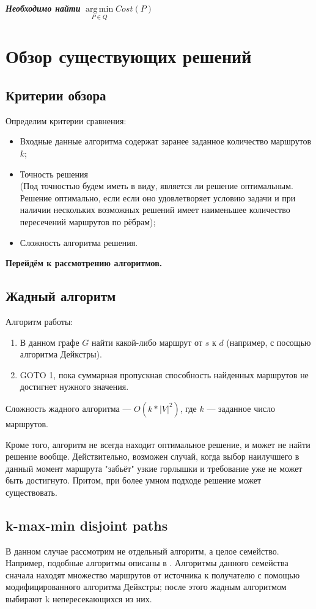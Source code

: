 \documentclass[a4paper]{article}
\DeclareMathOperator*{\argmin}{arg\,min}
\begin{document}
\textit{\textbf{Необходимо найти}} $\argmin\limits_{P\in Q} Cost(P)$

\newpage
\section{Обзор существующих решений}
\subsection{Критерии обзора}
Определим критерии сравнения:
\begin{itemize}
\item Входные данные алгоритма содержат заранее заданное количество маршрутов $k$;
\item Точность решения\\(Под точностью будем иметь в виду, является ли решение оптимальным. Решение оптимально, если если оно удовлетворяет условию задачи и при наличии нескольких возможных решений имеет наименьшее количество пересечений маршрутов по рёбрам);
\item Сложность алгоритма решения.
\end{itemize}

\textbf{Перейдём к рассмотрению алгоритмов.}

\subsection{Жадный алгоритм}
Алгоритм работы:
\begin{enumerate}
\item В данном графе $G$ найти какой-либо маршрут от $s$ к $d$ (например, с посощью алгоритма Дейкстры).
\item GOTO 1, пока суммарная пропускная способность найденных маршрутов не достигнет нужного значения.
\end{enumerate}

Сложность жадного алгоритма --- $O(k*|V|^2)$, где $k$ --- заданное число маршрутов.

Кроме того, алгоритм не всегда находит оптимальное решение, и может не найти решение вообще. Действительно, возможен случай, когда выбор наилучшего в данный момент маршрута "забьёт" узкие горлышки и требование уже не может быть достигнуто. Притом, при более умном подходе решение может существовать.

\subsection{k-max-min disjoint paths}
В данном случае рассмотрим не отдельный алгоритм, а целое семейство. Например, подобные алгоритмы описаны в \cite{kmaxmin1, kmaxmin2}. Алгоритмы данного семейства сначала находят множество маршрутов от источника к получателю с помощью модифицированного алгоритма Дейкстры; после этого жадным алгоритмом выбирают k непересекающихся из них.
\end{document}
